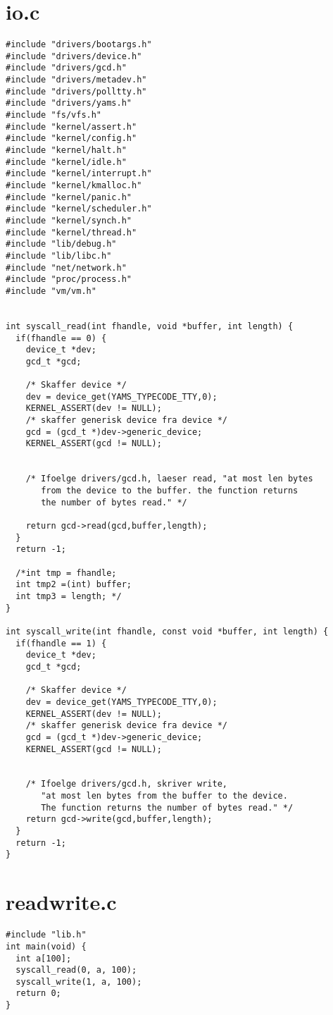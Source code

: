\documentclass[a4paper,12pt]{article}
\begin{document}
\section*{io.c}
\begin{lstlisting}
#include "drivers/bootargs.h"
#include "drivers/device.h"
#include "drivers/gcd.h"
#include "drivers/metadev.h"
#include "drivers/polltty.h"
#include "drivers/yams.h"
#include "fs/vfs.h"
#include "kernel/assert.h"
#include "kernel/config.h"
#include "kernel/halt.h"
#include "kernel/idle.h"
#include "kernel/interrupt.h"
#include "kernel/kmalloc.h"
#include "kernel/panic.h"
#include "kernel/scheduler.h"
#include "kernel/synch.h"
#include "kernel/thread.h"
#include "lib/debug.h"
#include "lib/libc.h"
#include "net/network.h"
#include "proc/process.h"
#include "vm/vm.h"


int syscall_read(int fhandle, void *buffer, int length) {
  if(fhandle == 0) {
    device_t *dev;
    gcd_t *gcd;

    /* Skaffer device */
    dev = device_get(YAMS_TYPECODE_TTY,0);
    KERNEL_ASSERT(dev != NULL);
    /* skaffer generisk device fra device */
    gcd = (gcd_t *)dev->generic_device;
    KERNEL_ASSERT(gcd != NULL);


    /* Ifoelge drivers/gcd.h, laeser read, "at most len bytes 
       from the device to the buffer. the function returns 
       the number of bytes read." */

    return gcd->read(gcd,buffer,length);
  }
  return -1;

  /*int tmp = fhandle;
  int tmp2 =(int) buffer;
  int tmp3 = length; */
}

int syscall_write(int fhandle, const void *buffer, int length) {
  if(fhandle == 1) {
    device_t *dev;
    gcd_t *gcd;

    /* Skaffer device */
    dev = device_get(YAMS_TYPECODE_TTY,0);
    KERNEL_ASSERT(dev != NULL);
    /* skaffer generisk device fra device */
    gcd = (gcd_t *)dev->generic_device;
    KERNEL_ASSERT(gcd != NULL);


    /* Ifoelge drivers/gcd.h, skriver write, 
       "at most len bytes from the buffer to the device. 
       The function returns the number of bytes read." */
    return gcd->write(gcd,buffer,length);
  }
  return -1;
}
\end{lstlisting}
\newpage

\section*{readwrite.c}
\begin{lstlisting}
#include "lib.h"
int main(void) {
  int a[100];
  syscall_read(0, a, 100); 
  syscall_write(1, a, 100);
  return 0;
}
\end{lstlisting}
\end{document}
